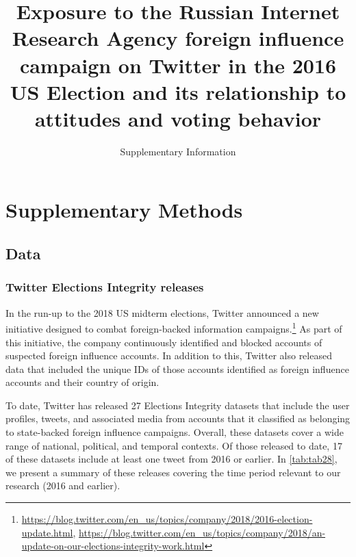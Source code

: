 \documentclass[
  12pt,
]{article}
\title{\Large \textbf{Exposure to the Russian Internet Research Agency foreign influence campaign on Twitter in the 2016 US Election and its relationship to attitudes and voting behavior}\vspace{2mm}}
\subtitle{\Large Supplementary Information}
\author{}
\date{\vspace{-2.5em}}
\begin{document}
\maketitle

{
\hypersetup{linkcolor=blue}
\setcounter{tocdepth}{2}
\tableofcontents
}
\renewcommand{\figureautorefname}{Supplementary Figure}
\renewcommand{\tableautorefname}{Supplementary Table}

\clearpage

\hypertarget{supplementary-methods}{%
\section*{Supplementary Methods}\label{supplementary-methods}}

\hypertarget{data}{%
\subsection{Data}\label{data}}

\hypertarget{twitter-elections-integrity-releases}{%
\subsubsection{Twitter Elections Integrity releases}\label{twitter-elections-integrity-releases}}

In the run-up to the 2018 US midterm elections, Twitter announced a new initiative designed to combat foreign-backed information campaigns.\footnote{\url{https://blog.twitter.com/en_us/topics/company/2018/2016-election-update.html}, \url{https://blog.twitter.com/en_us/topics/company/2018/an-update-on-our-elections-integrity-work.html}} As part of this initiative, the company continuously identified and blocked accounts of suspected foreign influence accounts. In addition to this, Twitter also released data that included the unique IDs of those accounts identified as foreign influence accounts and their country of origin.

To date, Twitter has released 27 Elections Integrity datasets that include the user profiles, tweets, and associated media from accounts that it classified as belonging to state-backed foreign influence campaigns. Overall, these datasets cover a wide range of national, political, and temporal contexts. Of those released to date, 17 of these datasets include at least one tweet from 2016 or earlier. In \autoref{tab:tab28}, we present a summary of these releases covering the time period relevant to our research (2016 and earlier).
\end{document}

